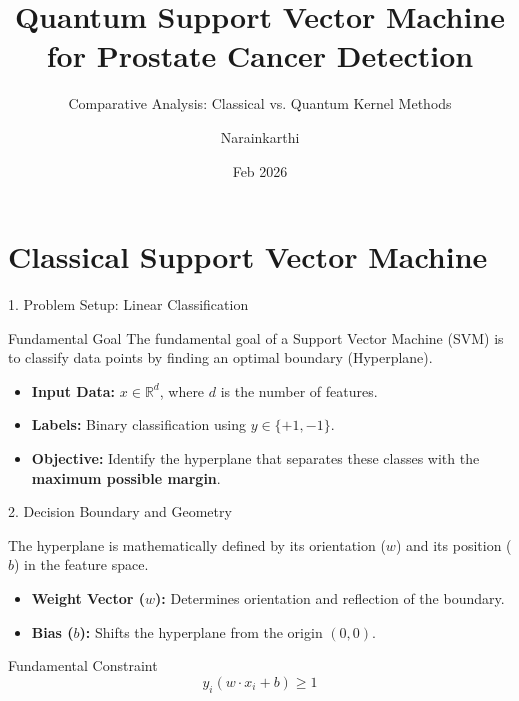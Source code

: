 \documentclass{beamer}
\title[QML Research]{Quantum Support Vector Machine for Prostate Cancer Detection}
\subtitle{Comparative Analysis: Classical vs. Quantum Kernel Methods}
\author{Narainkarthi}
\date{Feb 2026}
\begin{document}
\maketitle

\section{Classical Support Vector Machine}

\begin{frame}{1. Problem Setup: Linear Classification}

\begin{ResearchBox}{Fundamental Goal}
The fundamental goal of a Support Vector Machine (SVM) is to classify data points by finding an optimal boundary (Hyperplane).
\end{ResearchBox}

\begin{itemize}
    \item \textbf{Input Data:} $x \in \mathbb{R}^d$, where $d$ is the number of features.
    \item \textbf{Labels:} Binary classification using $y \in \{+1, -1\}$.
    \item \textbf{Objective:} Identify the hyperplane that separates these classes with the \textbf{maximum possible margin}.
\end{itemize}

\end{frame}

\begin{frame}{2. Decision Boundary and Geometry}

The hyperplane is mathematically defined by its orientation ($w$) and its position ($b$) in the feature space.

\begin{itemize}
    \item \textbf{Weight Vector ($w$):} Determines orientation and reflection of the boundary.
    \item \textbf{Bias ($b$):} Shifts the hyperplane from the origin $(0,0)$.
\end{itemize}

\begin{ResearchBox}{Fundamental Constraint}
\[
y_i(w \cdot x_i + b) \ge 1
\]
\end{ResearchBox}

\end{frame}
\end{document}
